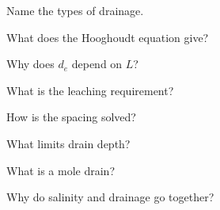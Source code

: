 \begin{exlist}
\item Name the types of drainage.
\item What does the Hooghoudt equation give?
\item Why does $d_e$ depend on $L$?
\item What is the leaching requirement?
\item How is the spacing solved?
\item What limits drain depth?
\item What is a mole drain?
\item Why do salinity and drainage go together?
\end{exlist}
